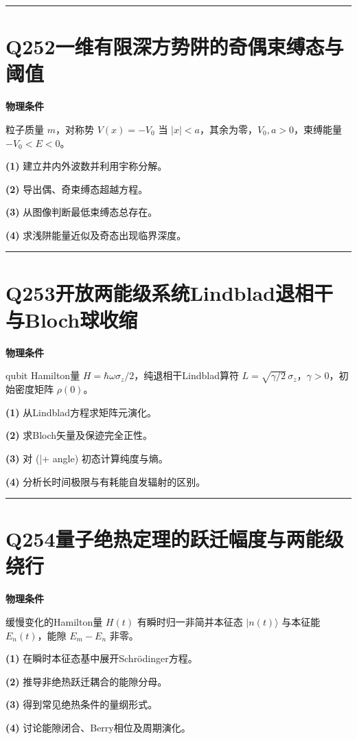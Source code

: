 \documentclass[UTF8,a4paper,11pt,oneside,openany]{ctexbook}
\begin{document}
\par\bigskip\hrule\bigskip
\section*{Q252\quad 一维有限深方势阱的奇偶束缚态与阈值}
\textbf{物理条件}\par 粒子质量 \(m\)，对称势 \(V(x)=-V_0\) 当 \(|x|<a\)，其余为零，\(V_0,a>0\)，束缚能量 \(-V_0<E<0\)。
\par\noindent\textbf{(1)} 建立井内外波数并利用宇称分解。
\par\noindent\textbf{(2)} 导出偶、奇束缚态超越方程。
\par\noindent\textbf{(3)} 从图像判断最低束缚态总存在。
\par\noindent\textbf{(4)} 求浅阱能量近似及奇态出现临界深度。

\par\bigskip\hrule\bigskip
\section*{Q253\quad 开放两能级系统Lindblad退相干与Bloch球收缩}
\textbf{物理条件}\par qubit Hamilton量 \(H=\hbar\omega\sigma_z/2\)，纯退相干Lindblad算符 \(L=\sqrt{\gamma/2}\,\sigma_z\)，\(\gamma>0\)，初始密度矩阵 \(\rho(0)\)。
\par\noindent\textbf{(1)} 从Lindblad方程求矩阵元演化。
\par\noindent\textbf{(2)} 求Bloch矢量及保迹完全正性。
\par\noindent\textbf{(3)} 对 (|+
angle) 初态计算纯度与熵。
\par\noindent\textbf{(4)} 分析长时间极限与有耗能自发辐射的区别。

\par\bigskip\hrule\bigskip
\section*{Q254\quad 量子绝热定理的跃迁幅度与两能级绕行}
\textbf{物理条件}\par 缓慢变化的Hamilton量 \(H(t)\) 有瞬时归一非简并本征态 \(|n(t)\rangle\) 与本征能 \(E_n(t)\)，能隙 \(E_m-E_n\) 非零。
\par\noindent\textbf{(1)} 在瞬时本征态基中展开Schrödinger方程。
\par\noindent\textbf{(2)} 推导非绝热跃迁耦合的能隙分母。
\par\noindent\textbf{(3)} 得到常见绝热条件的量纲形式。
\par\noindent\textbf{(4)} 讨论能隙闭合、Berry相位及周期演化。
\end{document}
